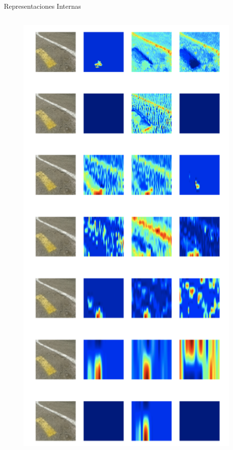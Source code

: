 \documentclass[10pt]{beamer}
\begin{document}
\begin{frame}{Representaciones Internas}
\begin{columns}
\begin{column}{0.31\textwidth}
\begin{figure}[!h]
                \includegraphics[width=\textwidth]{../img/predizq}
            \end{figure}
        \end{column}
        

\end{columns}
\end{frame}
\end{document}
